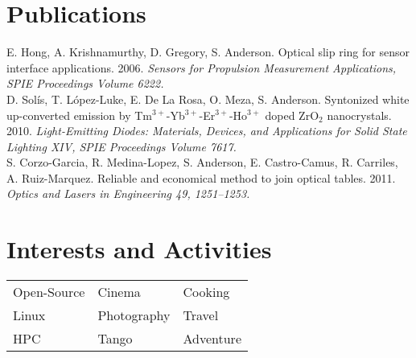 \documentclass[letterpaper,10pt]{article}
\begin{document}
\begin{minipage}[t]{0.44\textwidth}
\section{Publications}
	E. Hong, A. Krishnamurthy, D. Gregory, S. Anderson. Optical slip ring for sensor interface applications. 2006. \emph{Sensors for Propulsion Measurement Applications, SPIE Proceedings Volume 6222.}\\[5pt]
	D. Solís, T. López-Luke, E. De La Rosa, O. Meza, S. Anderson. Syntonized white up-converted emission by Tm$^{3+}$-Yb$^{3+}$-Er$^{3+}$-Ho$^{3+}$ doped ZrO$_{2}$ nanocrystals. 2010. \emph{Light-Emitting Diodes: Materials, Devices, and Applications for Solid State Lighting XIV, SPIE Proceedings Volume 7617.}\\[5pt]
	S. Corzo-Garcia, R. Medina-Lopez, S. Anderson, E. Castro-Camus, R. Carriles, A. Ruiz-Marquez. Reliable and economical method to join optical tables. 2011. \emph{Optics and Lasers in Engineering 49, 1251–1253.}\\

\section{Interests and Activities}
	\begin{tabular}{l|l|l}
		Open-Source	&	Cinema		&	Cooking\\
		Linux		&	Photography	&	Travel\\
		HPC			&	Tango		&	Adventure
	\end{tabular}
\end{minipage} 
\end{document}
